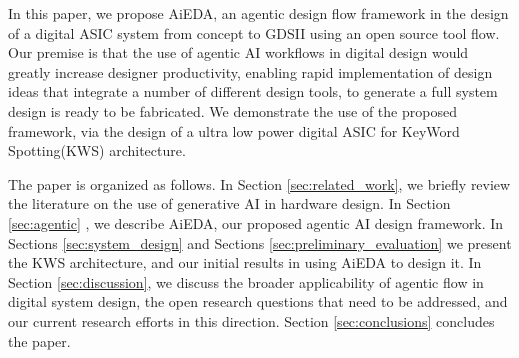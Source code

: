 In this paper, we propose AiEDA, an agentic design flow framework in the design of a digital ASIC system from concept to GDSII using an open source tool flow. Our premise is that the use of agentic AI workflows in digital design would greatly increase designer productivity, enabling rapid implementation of design ideas that integrate a number of different design tools, to generate a full system design is ready to be fabricated. We demonstrate the use of the proposed framework, via the design of a ultra low power digital ASIC for KeyWord Spotting(KWS) architecture. 

The paper is organized as follows. In Section \ref{sec:related_work}, we briefly review the literature on the use of generative AI in hardware design. 
In Section \ref{sec:agentic} , we describe AiEDA, our proposed agentic AI design framework. In Sections \ref{sec:system_design} and Sections \ref{sec:preliminary_evaluation} we present the KWS architecture, and our initial results in using AiEDA to design it. In Section \ref{sec:discussion}, we discuss the broader applicability of agentic flow in digital system design, the open research questions that need to be addressed, and our current research efforts in this direction. Section \ref{sec:conclusions} concludes the paper.

